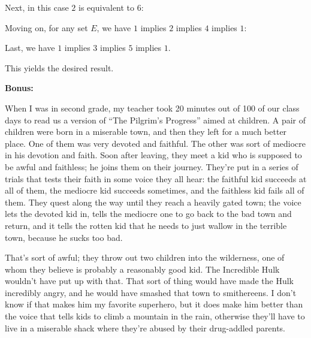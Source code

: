 \documentclass[a4paper,12pt]{article}
\newcommand{\tab}{\hspace{4mm}} %
\newcommand{\shunt}{\vspace{20mm}}
\begin{document}
Next, in this case $2$ is equivalent to $6$:

\tab %

Moving on, for any set $E$, we have $1$ implies $2$ implies $4$ implies $1$:

\tab %

Last, we have $1$ implies $3$ implies $5$ implies $1$.

\tab %

This yields the desired result.


\shunt

{\bf Bonus:}

When I was in second grade, my teacher took 20 minutes out of 100 of our class days to read us a version of ``The Pilgrim's Progress'' aimed at children. A pair of children were born in a miserable town, and then they left for a much better place. One of them was very devoted and faithful. The other was sort of mediocre in his devotion and faith. Soon after leaving, they meet a kid who is supposed to be awful and faithless; he joins them on their journey. They're put in a series of trials that tests their faith in some voice they all hear: the faithful kid succeeds at all of them, the mediocre kid succeeds sometimes, and the faithless kid fails all of them. They quest along the way until they reach a heavily gated town; the voice lets the devoted kid in, tells the mediocre one to go back to the bad town and return, and it tells the rotten kid that he needs to just wallow in the terrible town, because he sucks too bad.

That's sort of awful; they throw out two children into the wilderness, one of whom they believe is probably a reasonably good kid. The Incredible Hulk wouldn't have put up with that. That sort of thing would have made the Hulk incredibly angry, and he would have smashed that town to smithereens. I don't know if that makes him my favorite superhero, but it does make him better than the voice that tells kids to climb a mountain in the rain, otherwise they'll have to live in a miserable shack where they're abused by their drug-addled parents.
\shunt
\end{document}
